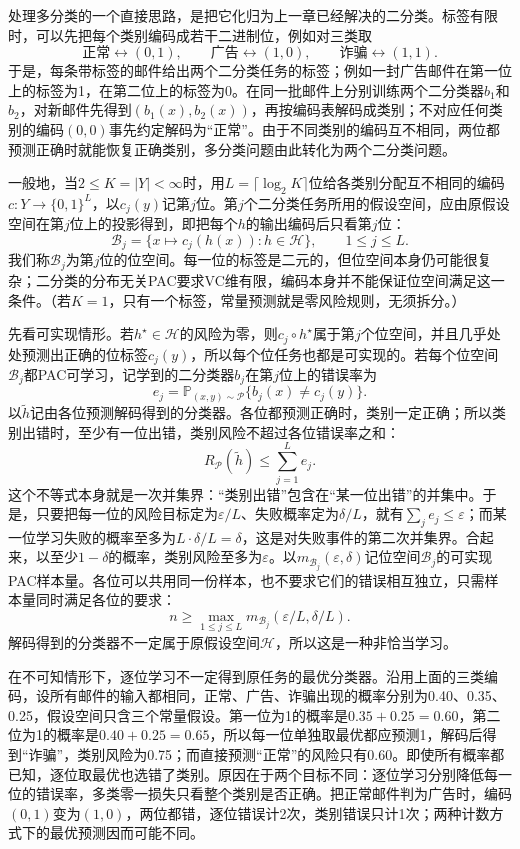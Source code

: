 处理多分类的一个直接思路，是把它化归为上一章已经解决的二分类。标签有限时，可以先把每个类别编码成若干二进制位，例如对三类取
\[
 \text{正常}\longleftrightarrow(0,1),\qquad
 \text{广告}\longleftrightarrow(1,0),\qquad
 \text{诈骗}\longleftrightarrow(1,1).
\]
于是，每条带标签的邮件给出两个二分类任务的标签；例如一封广告邮件在第一位上的标签为1，在第二位上的标签为0。在同一批邮件上分别训练两个二分类器$b_1$和$b_2$，对新邮件先得到$(b_1(x),b_2(x))$，再按编码表解码成类别；不对应任何类别的编码$(0,0)$事先约定解码为“正常”。由于不同类别的编码互不相同，两位都预测正确时就能恢复正确类别，多分类问题由此转化为两个二分类问题。

一般地，当$2\leq K=|Y|<\infty$时，用$L=\lceil\log_2K\rceil$位给各类别分配互不相同的编码$c:Y\to\{0,1\}^L$，以$c_j(y)$记第$j$位。第$j$个二分类任务所用的假设空间，应由原假设空间在第$j$位上的投影得到，即把每个$h$的输出编码后只看第$j$位：
\[
 \mathcal B_j=\{x\mapsto c_j(h(x)):h\in\mathcal H\},\qquad 1\leq j\leq L.
\]
我们称$\mathcal B_j$为第$j$位的位空间。每一位的标签是二元的，但位空间本身仍可能很复杂；二分类的分布无关PAC要求VC维有限，编码本身并不能保证位空间满足这一条件。（若$K=1$，只有一个标签，常量预测就是零风险规则，无须拆分。）

先看可实现情形。若$h^\star\in\mathcal H$的风险为零，则$c_j\circ h^\star$属于第$j$个位空间，并且几乎处处预测出正确的位标签$c_j(y)$，所以每个位任务也都是可实现的。若每个位空间$\mathcal B_j$都PAC可学习，记学到的二分类器$b_j$在第$j$位上的错误率为
\[
 e_j=\mathbb P_{(x,y)\sim\mathcal P}\{b_j(x)\neq c_j(y)\}.
\]
以$\tilde h$记由各位预测解码得到的分类器。各位都预测正确时，类别一定正确；所以类别出错时，至少有一位出错，类别风险不超过各位错误率之和：
\[
 R_{\mathcal P}(\tilde h)\leq\sum_{j=1}^L e_j.
\]
这个不等式本身就是一次并集界：“类别出错”包含在“某一位出错”的并集中。于是，只要把每一位的风险目标定为$\varepsilon/L$、失败概率定为$\delta/L$，就有$\sum_je_j\leq\varepsilon$；而某一位学习失败的概率至多为$L\cdot\delta/L=\delta$，这是对失败事件的第二次并集界。合起来，以至少$1-\delta$的概率，类别风险至多为$\varepsilon$。以$m_{\mathcal B_j}(\varepsilon,\delta)$记位空间$\mathcal B_j$的可实现PAC样本量。各位可以共用同一份样本，也不要求它们的错误相互独立，只需样本量同时满足各位的要求：
\[
 n\geq\max_{1\leq j\leq L}
 m_{\mathcal B_j}(\varepsilon/L,\delta/L).
\]
解码得到的分类器不一定属于原假设空间$\mathcal H$，所以这是一种非恰当学习。

在不可知情形下，逐位学习不一定得到原任务的最优分类器。沿用上面的三类编码，设所有邮件的输入都相同，正常、广告、诈骗出现的概率分别为0.40、0.35、0.25，假设空间只含三个常量假设。第一位为1的概率是$0.35+0.25=0.60$，第二位为1的概率是$0.40+0.25=0.65$，所以每一位单独取最优都应预测1，解码后得到“诈骗”，类别风险为0.75；而直接预测“正常”的风险只有0.60。即使所有概率都已知，逐位取最优也选错了类别。原因在于两个目标不同：逐位学习分别降低每一位的错误率，多类零一损失只看整个类别是否正确。把正常邮件判为广告时，编码$(0,1)$变为$(1,0)$，两位都错，逐位错误计2次，类别错误只计1次；两种计数方式下的最优预测因而可能不同。

